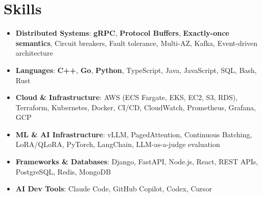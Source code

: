\documentclass[letterpaper,11pt]{article}
\newcommand{\resumeSubHeadingListStart}{\begin{itemize}[leftmargin=0.15in, label={}]}
\newcommand{\resumeSubHeadingListEnd}{\end{itemize}}
\newcommand{\resumeSkillHeading}[2]{%
  \item\small{\textbf{#1}: #2 \vspace{-9pt}}%
}
\begin{document}
\section{Skills}
  \resumeSubHeadingListStart
    \resumeSkillHeading{Distributed Systems}{\textbf{gRPC}, \textbf{Protocol Buffers}, \textbf{Exactly-once semantics}, Circuit breakers, Fault tolerance, Multi-AZ, Kafka, Event-driven architecture}
    \resumeSkillHeading{Languages}{\textbf{C++}, \textbf{Go}, \textbf{Python}, TypeScript, Java, JavaScript, SQL, Bash, Rust}
    \resumeSkillHeading{Cloud \& Infrastructure}{AWS (ECS Fargate, EKS, EC2, S3, RDS), Terraform, Kubernetes, Docker, CI/CD, CloudWatch, Prometheus, Grafana, GCP}
    \resumeSkillHeading{ML \& AI Infrastructure}{vLLM, PagedAttention, Continuous Batching, LoRA/QLoRA, PyTorch, LangChain, LLM-as-a-judge evaluation}
    \resumeSkillHeading{Frameworks \& Databases}{Django, FastAPI, Node.js, React, REST APIs, PostgreSQL, Redis, MongoDB}
    \resumeSkillHeading{AI Dev Tools}{Claude Code, GitHub Copilot, Codex, Cursor}
  \resumeSubHeadingListEnd
\end{document}
